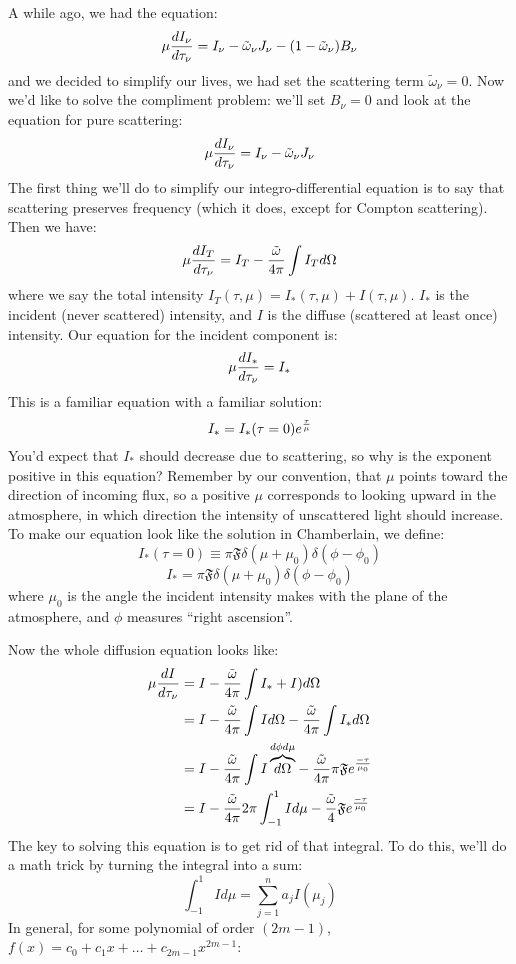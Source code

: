 \documentclass[11pt]{article}
\def\~{\tilde}
\begin{document}
A while ago, we had the equation:
$$\mu{dI_\nu\over d\tau_\nu}=I_\nu-\~\omega_\nu J_\nu-(1-\~\omega_\nu)B_\nu$$
and we decided to simplify our lives, we had set the scattering term
$\~\omega_\nu=0$.  Now we'd like to solve the compliment problem: we'll set
$B_\nu=0$ and look at the equation for pure scattering:
$$\mu{dI_\nu\over d\tau_\nu}=I_\nu-\~\omega_\nu J_\nu$$
The first thing we'll do to simplify our integro-differential equation is to
say that scattering preserves frequency (which it does, except for Compton
scattering).  Then we have:
\def\wt{{\~\omega}}
$$\mu\ddtau{I_T}=I_T-{\wt\over4\pi}\int{I_Td\Omega}$$
where we say the total intensity $I_T(\tau,\mu)=I_*(\tau,\mu)+I(\tau,\mu)$.
$I_*$ is the incident (never scattered) intensity, and $I$ is the diffuse
(scattered at least once) intensity.  Our equation for the incident component
is:
$$\mu{dI_*\over d\tau_\nu}=I_*$$
This is a familiar equation with a familiar solution:
$$I_*=I_*(\tau=0)e^{\tau\over\mu}$$
You'd expect that $I_*$ should decrease due to scattering, so why is the
exponent positive in this equation?  Remember by our convention, that
$\mu$ points toward the direction of incoming flux, so a positive $\mu$ 
corresponds to looking upward in the atmosphere, in which direction the
intensity of unscattered light should increase.  To make our equation look
like the solution in Chamberlain, we define:
$$I_*(\tau=0)\equiv\pi\mathfrak{F}\delta(\mu+\mu_0)\delta(\phi-\phi_0)$$
$$\boxed{I_*=\pi\mathfrak{F}\delta(\mu+\mu_0)\delta(\phi-\phi_0)}$$
where $\mu_0$ is the angle the incident intensity makes with the plane of
the atmosphere, and $\phi$ measures ``right ascension''.\par
Now the whole diffusion equation looks like:
$$\begin{aligned}\mu\ddtau{I}&=I-{\wt\over4\pi}\int{I_*+I)d\Omega}\\ 
&=I-{\wt\over4\pi}\int{Id\Omega}-{\wt\over4\pi}\int{I_*d\Omega}\\ 
&=I-{\wt\over4\pi}\int{I\overbrace{d\Omega}^{d\phi d\mu}}-{\wt\over4\pi}\pi
\mathfrak{F} e^{-\tau\over\mu_0}\\ 
&=I-{\wt\over4\pi}2\pi\int_{-1}^1{Id\mu}-{\wt\over4}\mathfrak{F} e^{-\tau\over\mu_0}\\ 
\end{aligned}$$
The key to solving this equation is to get rid of that integral.  To do this,
we'll do a math trick by turning the integral into a sum:
$$\int_{-1}^1{Id\mu}=\sum_{j=1}^n{a_jI(\mu_j)}$$
In general, for some polynomial of order $(2m-1)$, $f(x)=c_0+c_1x+\dots+c_{
2m-1}x^{2m-1}$:
\end{document}

